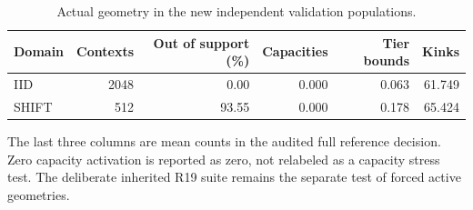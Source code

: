 \begin{table}[tbp]\centering\small
\caption{Actual geometry in the new independent validation populations.}\label{tab:r22-geometry}
\begin{tabular}{lrrrrr}
\toprule
Domain & Contexts & Out of support (\%) & Capacities & Tier bounds & Kinks\\
\midrule
IID & 2048 & 0.00 & 0.000 & 0.063 & 61.749\\
SHIFT & 512 & 93.55 & 0.000 & 0.178 & 65.424\\
\bottomrule
\end{tabular}
\par\smallskip\begin{minipage}{.98\textwidth}\small The last three columns are mean counts in the audited full reference decision. Zero capacity activation is reported as zero, not relabeled as a capacity stress test. The deliberate inherited R19 suite remains the separate test of forced active geometries.\end{minipage}
\end{table}
